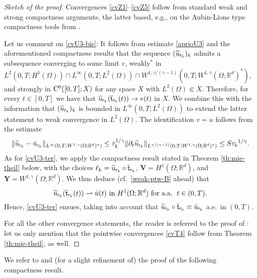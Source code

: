 \documentclass[a4paper,10pt,reqno]{amsart}
\numberwithin{equation}{section}
\newcommand{\R}{\mathbb{R}}
\numberwithin{equation}{section}
\newcommand{\weakto}{\rightharpoonup} %
\newcommand{\piecewiseConstant}[2]{\overline{#1}_{\kern-1pt#2}}
\newcommand{\pwc}{\piecewiseConstant}
\newcommand{\piecewiseLinear}[2]{{#1}_{\kern-1pt#2}}
\newcommand{\pwl}{\piecewiseLinear}
\newcommand{\pwwll}[2]{\widehat{#1}_{\kern-1pt#2}}
\newcommand{\foraa}{\text{for a.a. }}
\newcommand{\bsV}{\mathbf{V}}
\newcommand{\bsY}{\mathbf{Y}}
\newcommand{\uu}{u}
\begin{document}
\begin{proof}[Sketch of the proof]
Convergences \eqref{cvZ1}--\eqref{cvZ5} follow from standard weak and strong compactness arguments, the latter based, e.g., on the Aubin-Lions type compactness
tools from \cite{simon86}.
\par
Let us  comment on \eqref{cvU3-bis}: It follows from estimate \eqref{aprioU3} and the aforementioned compactness results that the sequence  $(\pwwll{u}{\tau_k})_k$ admits a subsequence  converging to some limit $v$, weakly$^*$  in $L^2(0,T;H^1(\Omega))
 \cap L^\infty(0,T;L^2(\Omega)) \cap W^{1,\gamma/(\gamma-1)}(0,T;W^{1,\gamma}(\Omega;\R^d)^*)$, and strongly in 
 ${\mathrm C}^0([0,T];X)$ for any space $X$ with $L^2(\Omega) \Subset X$. Therefore, 
 for every $t\in [0,T]$ we have that $\pwwll {u}{\tau_k}(\pwc{\mathsf{t}}{\tau_k}(t))  \to v(t)$ in $X$. We combine this with the information that 
 $(\pwwll{u}{\tau_k})_k$  is bounded in $ L^\infty(0,T;L^2(\Omega)) $ to extend the latter  statement to weak convergence in $L^2(\Omega)$. The identification $v = \dot{u}$ follows from the estimate 
\[
 \| \pwwll \uu{\tau_k} - \pwl {\dot \uu}{\tau_k}\|_{L^\infty
(0,T;  W^{1,\gamma}(\Omega;\R^d)^* )}\leq \tau_k^{1/\gamma}  \| \partial_t \pwwll
 {\uu}{\tau_k} \|_{L^{\gamma/(\gamma{-}1)} (0,T;W^{1,\gamma}(\Omega;\R^d)^*)} \leq S {\tau_k}^{1/\gamma}.
\]
As for \eqref{cvU3-ter},  we apply the compactness result %
stated in Theorem \ref{th:mie-theil} below,
 with the choices
$\ell_k =  \pwwll \uu{\tau_k}  \circ \pwc{\mathsf{t}}{\tau_k}$, $\bsV = H^1(\Omega;\R^d)$, and $\bsY = W^{1,\gamma}(\Omega;\R^d)$. 
We thus deduce (cf.\ \eqref{weak-ptw-B} ahead) that 
\[
 \pwwll \uu{\tau_k}(\pwc{\mathsf{t}}{\tau_k} (t)) \weakto \dot{u}(t)  \text{ in } H^1(\Omega;\R^d) \ \foraa\, t \in (0,T). 
\]
Hence, \eqref{cvU3-ter} ensues, taking into account that $ \pwwll \uu{\tau_k} \circ \pwc{\mathsf{t}}{\tau_k}  \equiv \pwl{\dot u}{\tau_k}$ a.e.\ in $(0,T)$.
\par
 For  all the other convergence statements, the reader is referred to the proof of \cite[Lemma 4.6]{Rossi2016}: let us only mention that the pointwise convergences 
 \eqref{cvT4} follow from 
  Theorem 
  \ref{th:mie-theil}, as well. 
  \end{proof}
  \par
  We refer to \cite{Rocca-Rossi} and \cite{Rossi2016} (for a slight refinement of) the proof of the following compactness result.
\end{document}
